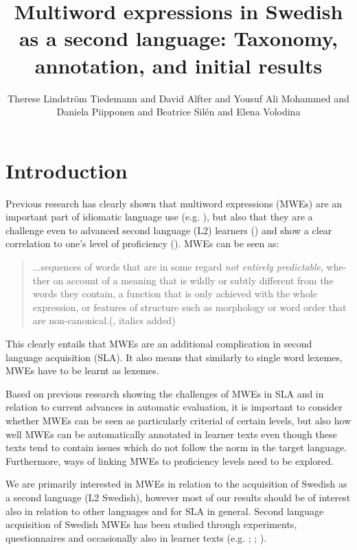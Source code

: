 \documentclass[output=paper,colorlinks,citecolor=brown]{langscibook}
\title[Multiword expressions in Swedish as a second language]{Multiword expressions in Swedish as a second language: Taxonomy, annotation, and initial results}
\author{Therese Lindström Tiedemann\affiliation{University of Helsinki, Finland} and 
David Alfter\affiliation{University of Gothenburg, Sweden} and
Yousuf Ali Mohammed\affiliation{University of Gothenburg, Sweden} and
Daniela Piipponen\affiliation{University of Helsinki, Finland} and
Beatrice Silén\affiliation{University of Helsinki, Finland} and
Elena Volodina\affiliation{University of Gothenburg, Sweden}}
\begin{document}
\maketitle
{}
\section{Introduction}
\label{sec:Intro}
Previous research has clearly shown that multiword expressions (MWEs) are an important part of idiomatic language use (e.g. \cite{paquot2019phraseological}), but also that they are a challenge even to advanced second language (L2) learners (\cite{pawley1983two, wray2002formulaic}) and show a clear correlation to one’s level of proficiency (\cite{forsberg2010using}). 
MWEs can be seen as:
\begin{quote}
...sequences of words that are in some regard \textit{not entirely predictable}, whe-ther on account of a meaning that is wildly or subtly different from the words they contain, a function that is only achieved with the whole expression, or features of structure such as morphology or word order that are non-canonical.\hfill(\cite[317]{wray2013formulaic}, italics added)\hbox{}
\end{quote}
This clearly entails that MWEs are an additional complication in second language acquisition (SLA). It also means that similarly to single word lexemes, MWEs have to be learnt as lexemes. 


Based on previous research showing the challenges of MWEs in SLA and in relation to current advances in automatic evaluation, it is important to consider whether MWEs can be seen as particularly criterial of certain levels, but also how well MWEs can be automatically annotated in learner texts even though these texts tend to contain issues which do not follow the norm in the target language. Furthermore, ways of linking MWEs to proficiency levels need to be explored.

We are primarily interested in MWEs in relation to the acquisition of Swedish as a second language (L2 Swedish), however most of our results should be of interest also in relation to other languages and for SLA in general. Second language acquisition of Swedish MWEs has been studied through experiments, questionnaires and occasionally also in learner texts (e.g. \cite{prentice2013flerordsenheter}; 
\cite{enstrom1990feltyper};  
\cite{abrahamsson2009age}).
\end{document}
